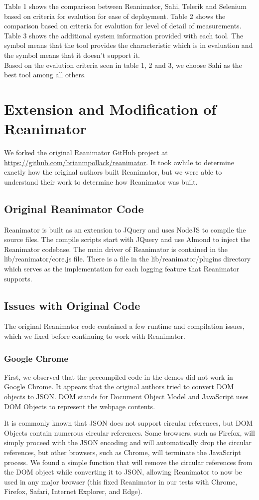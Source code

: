\documentclass[12pt,journal]{IEEEtran}
\begin{document}
\par
Table 1 shows the comparison between Reanimator, Sahi, Telerik  and Selenium based on criteria for evalution for ease of deployment. Table 2 shows the comparison based on criteria for evalution for level of detail of measurements. Table 3 shows the additional system information provided with each tool. The symbol  means that the tool provides the characteristic which is in evaluation and the symbol  means that it doesn’t support it. \\
Based on the evalution criteria seen in table 1, 2 and 3, we choose Sahi as the best tool among all others.


\section{Extension and Modification of Reanimator}
We forked the original Reanimator GitHub project at \href{https://github.com/brianmpollack/reanimator}{https://github.com/brianmpollack/reanimator}. It took awhile to determine exactly how the original authors built Reanimator, but we were able to understand their work to determine how Reanimator was built.
\subsection{Original Reanimator Code}
Reanimator is built as an extension to JQuery and uses NodeJS to compile the source files. The compile scripts start with JQuery and use Almond to inject the Reanimator codebase. The main driver of Reanimator is contained in the lib/reanimator/core.js file. There is a file in the lib/reanimator/plugins directory which serves as the implementation for each logging feature that Reanimator supports.

\subsection{Issues with Original Code}
The original Reanimator code contained a few runtime and compilation issues, which we fixed before continuing to work with Reanimator.

\subsubsection{Google Chrome}
First, we observed that the precompiled code in the demos did not work in Google Chrome. It appears that the original authors tried to convert DOM objects to JSON. DOM stands for Document Object Model and JavaScript uses DOM Objects to represent the webpage contents.
\par
It is commonly known that JSON does not support circular references, but DOM Objects contain numerous circular references. Some browsers, such as Firefox, will simply proceed with the JSON encoding and will automatically drop the circular references, but other browsers, such as Chrome, will terminate the JavaScript process. We found a simple function that will remove the circular references from the DOM object while converting it to JSON, allowing Reanimator to now be used in any major browser (this fixed Reanimator in our tests with Chrome, Firefox, Safari, Internet Explorer, and Edge).
\end{document}
